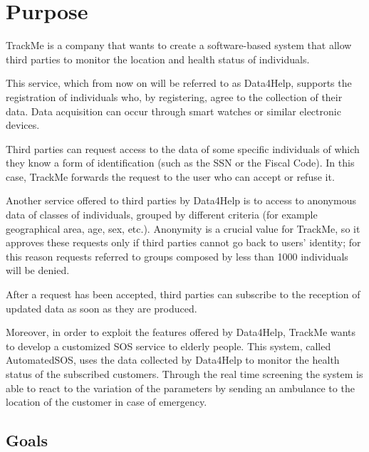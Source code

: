 \section{Purpose}
TrackMe is a company that wants to create a software-based system that allow third parties to monitor the location and health status of individuals. 
\par This service, which from now on will be referred to as Data4Help, supports the registration of individuals who, by registering, agree to the collection of their data. Data acquisition can occur through smart watches or similar electronic devices.
\par Third parties can request access to the data of some specific individuals of which they know a form of identification (such as the SSN or the Fiscal Code). In this case, TrackMe forwards the request to the user who can accept or refuse it.
\par Another service offered to third parties by Data4Help is to access to anonymous data of classes of individuals, grouped by different criteria (for example geographical area, age, sex, etc.). Anonymity is a crucial value for TrackMe, so it approves these requests only if third parties cannot go back to users' identity; for this reason requests referred to groups composed by less than 1000 individuals will be denied.
\par After a request has been accepted, third parties can subscribe to the reception of updated data as soon as they are produced.
\par Moreover, in order to exploit the features offered by Data4Help, TrackMe wants to develop a customized SOS service to elderly people. This system, called AutomatedSOS, uses the data collected by Data4Help to monitor the health status of the subscribed customers. Through the real time screening the system is able to react to the variation of the parameters by sending an ambulance to the location of the customer in case of emergency.

\pagebreak
\subsection{Goals}

